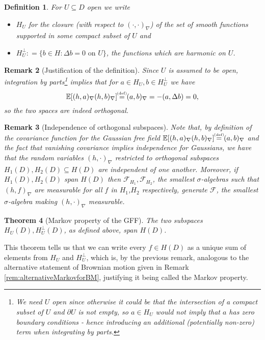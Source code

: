 \documentclass[11pt,reqno]{amsart}
\numberwithin{equation}{section}
\newtheorem{thm}{Theorem}[section]
\newtheorem{defi}[thm]{Definition}
\newtheorem{rem}[thm]{Remark}
\newcommand{\eqbydef}{\mathrel{\stackrel{\hspace*{-3mm}\text{\tiny(def)}\hspace*{-3mm}}{=}}}
\newcommand{\deq}{\mathrel{\mathop:}=}
\begin{document}
\begin{defi}
	For $U\subseteq D$ open we write \begin{itemize}
		\item $H_U$ for the closure (with respect to $(\cdot,\cdot)_\nabla$) of the set of smooth functions supported in some compact subset of $U$ and
		\item $H_U^\perp\deq \{b\in H: \Delta b=0 \text{ on }U\}$, the functions which are harmonic on $U$.
	\end{itemize}
\end{defi}

\begin{rem}[Justification of the definition]
	Since $U$ is assumed to be open, integration by parts\footnote{We need $U$ open since otherwise it could be that the intersection of a compact subset of $U$ and $\partial U$ is not empty, so $a\in H_U$ would not imply that $a$ has zero boundary conditions - hence introducing an additional (potentially non-zero) term when integrating by parts.} implies that for $a\in H_U, b\in H_U^\perp$ we have $$\mathbb E[(h,a)_\nabla(h,b)_\nabla]\eqbydef (a,b)_\nabla = -(a,\Delta b)=0,$$
	so the two spaces are indeed orthogonal.
\end{rem}

\begin{rem}[Independence of orthogonal subspaces]
	Note that, by definition of the covariance function for the Gaussian free field $\mathbb E[(h,a)_\nabla(h,b)_\nabla]\eqbydef(a,b)_\nabla$ and the fact that vanishing covariance implies independence for Gaussians, we have that the random variables $(h,\cdot)_\nabla$ restricted to orthogonal subspaces $H_1(D),H_2(D)\subseteq H(D)$ are independent of one another. Moreover, if $H_1(D),H_2(D)$ span $H(D)$ then $\mathcal F_{H_1},\mathcal F_{H_2}$, the smallest $\sigma$-algebras such that $(h,f)_\nabla$ are measurable for all $f$ in $H_1$,$H_2$ respectively, generate $\mathcal F$, the smallest $\sigma$-algebra making $(h,\cdot)_\nabla$ measurable. 
\end{rem}

\begin{thm}[Markov property of the GFF]\label{thm:MarkovProperty}
	The two subspaces $H_U(D), H_U^\perp(D)$, as defined above, span $H(D)$.
\end{thm}

This theorem tells us that we can write every $f\in H(D)$ as a unique sum of elements from $H_U$ and $H_U^\perp$, which is, by the previous remark, analogous to the alternative statement of Brownian motion given in Remark \ref{rem:alternativeMarkovforBM}, justifying it being called the Markov property.
\end{document}
